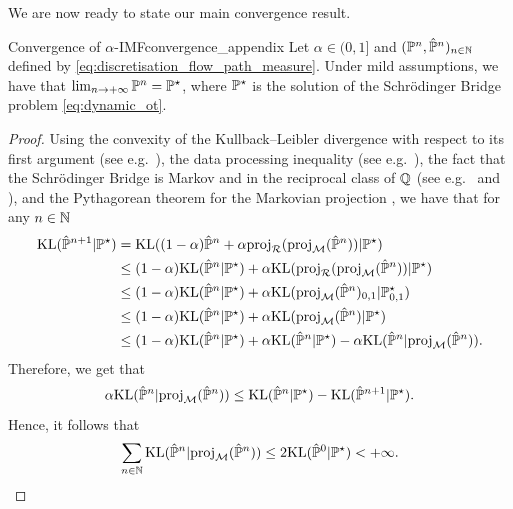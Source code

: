 \documentclass{article}
\begin{document}
We are now ready to state our main convergence result. 

\begin{proposition}{Convergence of $\alpha$-IMF}{convergence_appendix}
Let $\alpha \in (0, 1]$ and $(\mathbb{P}^n, \hat{\mathbb{P}}^n)_{n \in \mathbb{N}}$ defined by \eqref{eq:discretisation_flow_path_measure}. 
    Under mild assumptions, we have that 
    $\lim_{n \to +\infty} \mathbb{P}^n = \mathbb{P}^\star$, where $\mathbb{P}^\star$ is the solution of the Schr\"odinger Bridge problem \eqref{eq:dynamic_ot}.
\end{proposition}

\begin{proof}
Using the convexity of the Kullback--Leibler divergence with respect to its first argument (see e.g.~\citep{dupuis2011weak}), the data processing inequality (see e.g.~\cite[Lemma 9.4.5]{ambrosio200gradient}), the fact that the Schr\"odinger Bridge is Markov and in the reciprocal class of $\mathbb{Q}$ (see e.g.~\citep[Theorem 2.12]{leonard2014survey} and \citep[Theorem 3.2]{leonard2014reciprocal}), and the Pythagorean theorem for the Markovian projection \citep[Lemma 6]{shi2023DSBM}, we have that for any $n \in \mathbb{N}$
\begin{align}
    \KL(\hat{\Pbb}^{n+1} | \Pbb^\star) &= \KL((1-\alpha) \hat{\Pbb}^{n} + \alpha \projsimpleR(\projM(\hat{\Pbb}^n)) | \Pbb^\star) \\
    &\leq (1-\alpha) \KL( \hat{\Pbb}^{n} | \Pbb^\star) + \alpha \KL( \projsimpleR(\projM(\hat{\Pbb}^n)) | \Pbb^\star) \\
    &\leq (1-\alpha) \KL( \hat{\Pbb}^{n} | \Pbb^\star) + \alpha \KL( \projM(\hat{\Pbb}^n)_{0,1} | \Pbb^\star_{0,1}) \\
    &\leq (1-\alpha) \KL( \hat{\Pbb}^{n} | \Pbb^\star) + \alpha \KL( \projM(\hat{\Pbb}^n) | \Pbb^\star) \\
    &\leq (1-\alpha) \KL( \hat{\Pbb}^{n} | \Pbb^\star) + \alpha \KL( \hat{\Pbb}^n | \Pbb^\star) - \alpha \KL( \hat{\Pbb}^n | \projM(\hat{\Pbb}^n)) .
    \label{eq:kl_inequality_phat}
\end{align}
Therefore, we get that 
\begin{equation}
    \alpha \mathrm{KL}( \hat{\mathbb{P}}^n | \mathrm{proj}_{\mathcal{M}}(\hat{\mathbb{P}}^n)) \leq \mathrm{KL}( \hat{\mathbb{P}}^{n} | \mathbb{P}^\star) - \mathrm{KL}(\hat{\mathbb{P}}^{n+1} | \mathbb{P}^\star) .
\end{equation}
Hence, it follows that
\begin{equation}
 \sum_{n \in \mathbb{N}} \mathrm{KL}( \hat{\mathbb{P}}^n | \mathrm{proj}_{\mathcal{M}}(\hat{\mathbb{P}}^n)) \leq 2 \mathrm{KL}(\hat{\mathbb{P}}^0 | \mathbb{P}^\star) < +\infty . 
\end{equation}

\end{proof}
\end{document}
